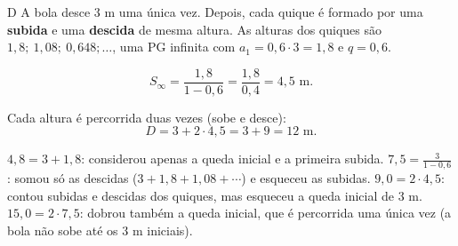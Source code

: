 \begin{resolucao}{D}
 A bola desce 3 m uma única vez. Depois, cada
quique é formado por uma \textbf{subida} e uma \textbf{descida} de mesma
altura. As alturas dos quiques são $1{,}8;\ 1{,}08;\ 0{,}648; \dots$, uma PG
infinita com $a_1 = 0{,}6 \cdot 3 = 1{,}8$ e $q = 0{,}6$.

\[
S_\infty = \frac{1{,}8}{1 - 0{,}6} = \frac{1{,}8}{0{,}4} = 4{,}5 \text{ m}.
\]

 Cada altura é percorrida duas vezes (sobe e
desce):
\[
D = 3 + 2 \cdot 4{,}5 = 3 + 9 = 12 \text{ m}.
\]


\begin{distratores}
 $4{,}8 = 3 + 1{,}8$: considerou apenas a queda inicial e a primeira
subida.
 $7{,}5 = \frac{3}{1 - 0{,}6}$: somou só as descidas
($3 + 1{,}8 + 1{,}08 + \cdots$) e esqueceu as subidas.
 $9{,}0 = 2 \cdot 4{,}5$: contou subidas e descidas dos quiques, mas
esqueceu a queda inicial de 3 m.
 $15{,}0 = 2 \cdot 7{,}5$: dobrou também a queda inicial, que é
percorrida uma única vez (a bola não sobe até os 3 m iniciais).
\end{distratores}
\end{resolucao}

